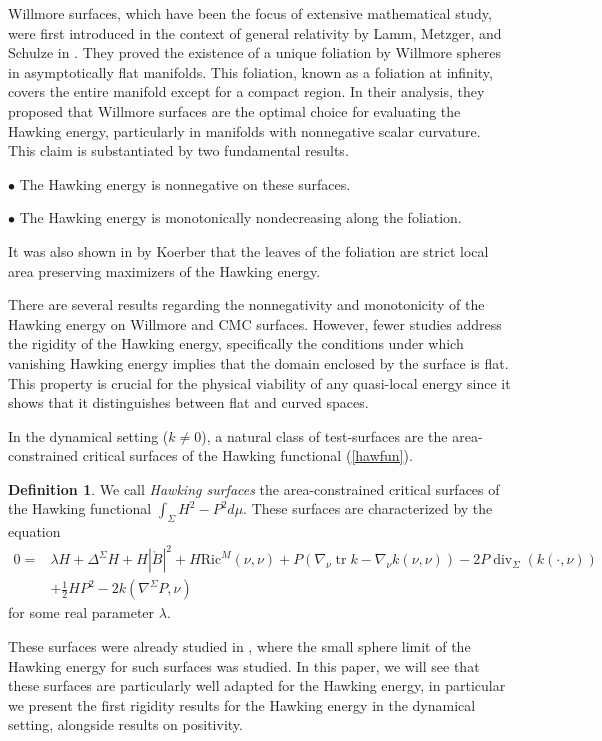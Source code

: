 \documentclass[12pt,a4paper]{amsart}
\theoremstyle{plain}
\theoremstyle{definition}
\newtheorem*{definition*}{Definition}
\newcommand{\diver}{\operatorname{div}}
\newcommand{\tr}{\operatorname{tr}}
\begin{document}
Willmore surfaces, which have been the focus of extensive mathematical study, were first introduced in the context of general relativity by Lamm, Metzger, and Schulze in \cite{willflat}. They proved the existence of a unique foliation by Willmore spheres in asymptotically flat manifolds. This foliation, known as a foliation at infinity, covers the entire manifold except for a compact region. In their analysis, they proposed that Willmore surfaces are the optimal choice for evaluating the Hawking energy, particularly in manifolds with nonnegative scalar curvature. This claim is substantiated by two fundamental results. 


$\bullet$ The Hawking energy is nonnegative on these surfaces.

$\bullet$ The Hawking energy is monotonically nondecreasing along the foliation. 

It was also shown in \cite{Thomas} by Koerber that the leaves of the foliation are strict local area preserving maximizers of the Hawking energy.

There are several results regarding the nonnegativity and monotonicity of the Hawking energy on Willmore and CMC surfaces. However, fewer studies address the rigidity of the Hawking energy, specifically the conditions under which vanishing Hawking energy implies that the domain enclosed by the surface is flat. This property is crucial for the physical viability of any quasi-local energy since it shows that it distinguishes between flat and curved spaces. 



In the dynamical setting ($k\neq 0$), a natural class of test‐surfaces are the area-constrained critical surfaces of the Hawking functional (\ref{hawfun}).   
\begin{definition*}
 We call \emph{Hawking surfaces} the area-constrained critical surfaces of the Hawking functional $ \int_\Sigma H^2 -P^2 d\mu$. These surfaces are characterized by the equation 
 \begin{equation*}
\begin{split}
   0=& \lambda H  +\Delta^\Sigma H + H|\mathring{B}|^2+ H \mathrm{Ric}^M(\nu, \nu)+P( \nabla_\nu \tr k - \nabla_\nu k(\nu,\nu )) - 2P \diver_\Sigma (k(\cdot, \nu))\\ & +\frac{1}{2}H P^2 - 2k (\nabla^\Sigma P, \nu )
    \end{split}
\end{equation*}
for some real parameter $\lambda$.
\end{definition*}
These surfaces were already studied in \cite{Alex, diaz2023local}, where the small sphere limit of the Hawking energy for such surfaces was studied. In this paper, we will see that these surfaces are  particularly well adapted for the Hawking energy, in particular  we present the first rigidity results for the Hawking energy in the dynamical setting, alongside results on positivity.
\end{document}
